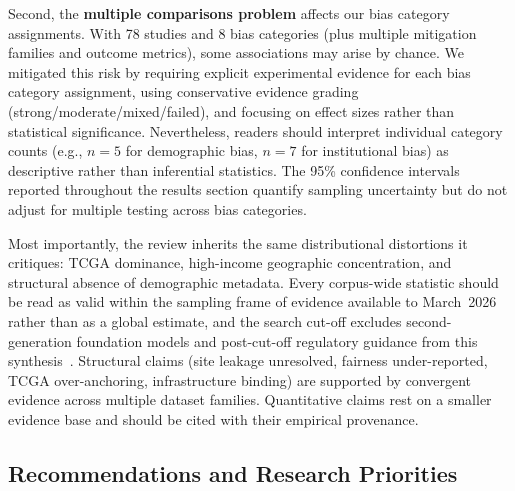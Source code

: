 Second, the \textbf{multiple comparisons problem} affects our bias category assignments. With 78 studies and 8 bias categories (plus multiple mitigation families and outcome metrics), some associations may arise by chance. We mitigated this risk by requiring explicit experimental evidence for each bias category assignment, using conservative evidence grading (strong/moderate/mixed/failed), and focusing on effect sizes rather than statistical significance. Nevertheless, readers should interpret individual category counts (e.g., $n=5$ for demographic bias, $n=7$ for institutional bias) as descriptive rather than inferential statistics. The 95\% confidence intervals reported throughout the results section quantify sampling uncertainty but do not adjust for multiple testing across bias categories.

Most importantly, the review inherits the same distributional distortions it critiques: TCGA dominance, high-income geographic concentration, and structural absence of demographic metadata. Every corpus-wide statistic should be read as valid within the sampling frame of evidence available to March~2026 rather than as a global estimate, and the search cut-off excludes second-generation foundation models and post-cut-off regulatory guidance from this synthesis~\citep{biswas2026digital}. Structural claims (site leakage unresolved, fairness under-reported, TCGA over-anchoring, infrastructure binding) are supported by convergent evidence across multiple dataset families. Quantitative claims rest on a smaller evidence base and should be cited with their empirical provenance.

\subsection{Recommendations and Research Priorities}
\label{sec:discussion:agenda}

